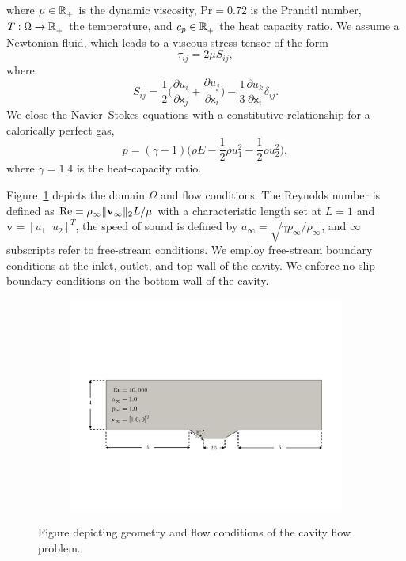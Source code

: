 where $\mu \in \mathbb{R}^{}_{+}$ is the dynamic viscosity, $\text{Pr} = 0.72$ is the Prandtl number, $T : \Omega \rightarrow \mathbb{R}^{}_{+}$ the temperature, and $c_p \in \mathbb{R}^{}_{+}$ the heat capacity ratio.
We assume a Newtonian fluid, which leads to a viscous stress tensor of the form
\begin{equation*}
\tau_{ij} = 2\mu S_{ij},
\end{equation*}
where
\begin{equation*}
 S_{ij} = \frac{1}{2} \big( \frac{\partial u_i}{\partial \mathsf{x}_j} + \frac{\partial u_j}{\partial \mathsf{x}_i} \big) - \frac{1}{3} \frac{\partial      u_k}{\partial \mathsf{x}_i} \delta_{ij}.
\end{equation*}
We close the Navier--Stokes equations with a constitutive relationship for a calorically perfect gas,
$$p = (\gamma - 1)( \rho E - \frac{1}{2} \rho u_1^2 - \frac{1}{2} \rho u_2^2 \big),$$
where $\gamma = 1.4$ is the heat-capacity ratio.

Figure~\ref{fig:cav_fig} depicts the domain $\Omega$ and flow conditions. The Reynolds number is defined as $\text{Re} = \rho_{\infty} \| \mathbf{v}_{\infty} \|_2 L / \mu$ with a characteristic length set at $L=1$ and $\mathbf{v} = [u_1 \; \; u_2]^T$, the speed of sound is defined by $a_{\infty} = \sqrt{\gamma p_{\infty}/\rho_{\infty}}$, and $\infty$ subscripts refer to free-stream conditions. We employ free-stream boundary conditions at the inlet, outlet, and top wall of the cavity. We enforce no-slip boundary conditions 
on the bottom wall of the cavity. 

\begin{figure}
\begin{center}
\begin{subfigure}[t]{0.85\textwidth}
\includegraphics[trim={2cm 5.5cm 1cm 7cm},clip,width=0.98\linewidth]{figs/cavity_new/cav_geom.pdf}
\end{subfigure}
\caption{Figure depicting geometry and flow conditions of the cavity flow problem.} 
\label{fig:cav_fig}
\end{center}
\end{figure}

